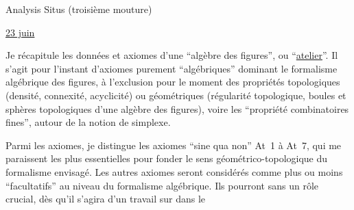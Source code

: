 \begin{center}Analysis Situs (troisième mouture)\end{center}

\uline{23 juin}

Je récapitule les données et axiomes d'une ``algèbre des figures'', ou ``\uline{atelier}''. \margin{--}Il s'agit pour l'instant d'axiomes purement ``algébriques'' dominant le formalisme algébrique des figures, à l'exclusion pour le moment des propriétés topologiques (densité, connexité, acyclicité) ou  géométriques (régularité topologique, boules et sphères topologiques d'une algèbre des figures), voire les ``propriété combinatoires fines'', autour de la notion de simplexe.

Parmi les axiomes, je distingue les axiomes ``sine qua non'' At~1 à At~7, qui me paraissent les plus essentielles pour fonder le sens géométrico-topologique du formalisme envisagé. Les autres axiomes seront considérés comme plus ou moins ``facultatifs'' au niveau du formalisme algébrique. Ils pourront sans  un rôle crucial, dès qu'il s'agira d'un travail sur  dans le
